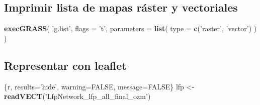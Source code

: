 \documentclass[11pt,]{article}
\newenvironment{Shaded}{\begin{snugshade}}{\end{snugshade}}
\newcommand{\KeywordTok}[1]{\textcolor[rgb]{0.13,0.29,0.53}{\textbf{#1}}}
\newcommand{\DataTypeTok}[1]{\textcolor[rgb]{0.13,0.29,0.53}{#1}}
\newcommand{\StringTok}[1]{\textcolor[rgb]{0.31,0.60,0.02}{#1}}
\newcommand{\OtherTok}[1]{\textcolor[rgb]{0.56,0.35,0.01}{#1}}
\newcommand{\NormalTok}[1]{#1}
\begin{document}
\subsection{Imprimir lista de mapas ráster y
vectoriales}\label{imprimir-lista-de-mapas-ruxe1ster-y-vectoriales}

\begin{Shaded}
\begin{Highlighting}[]
\KeywordTok{execGRASS}\NormalTok{(}
  \StringTok{'g.list'}\NormalTok{,}
  \DataTypeTok{flags =} \StringTok{'t'}\NormalTok{,}
  \DataTypeTok{parameters =} \KeywordTok{list}\NormalTok{(}
    \DataTypeTok{type =} \KeywordTok{c}\NormalTok{(}\StringTok{'raster'}\NormalTok{, }\StringTok{'vector'}\NormalTok{)}
\NormalTok{  )}
\NormalTok{)}
\end{Highlighting}
\end{Shaded}

\subsection{Representar con leaflet}\label{representar-con-leaflet}

\begin{Shaded}
\begin{Highlighting}[]
\NormalTok{   \{r, results=}\StringTok{'hide'}\NormalTok{, warning=}\OtherTok{FALSE}\NormalTok{, message=}\OtherTok{FALSE}\NormalTok{\}}
\NormalTok{lfp <-}\StringTok{ }\KeywordTok{readVECT}\NormalTok{(}\StringTok{'LfpNetwork_lfp_all_final_ozm'}\NormalTok{)}
\end{Highlighting}
\end{Shaded}
\end{document}

